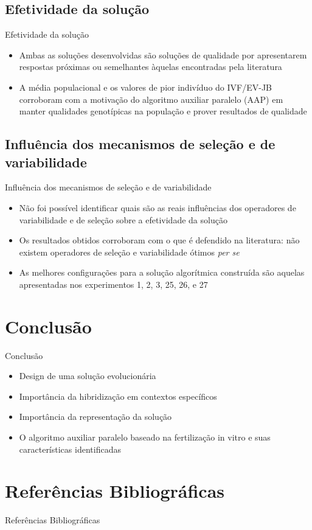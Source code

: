 \documentclass{beamer}
\begin{document}
\subsection{Efetividade da solução}
\begin{frame}{Efetividade da solução}
\begin{itemize}
\item<1-> Ambas as solu\c{c}\~{o}es desenvolvidas s\~{a}o solu\c{c}\~{o}es de qualidade por apresentarem respostas
pr\'{o}ximas ou semelhantes \`{a}quelas encontradas pela literatura
\item<2-> A m\'{e}dia populacional e os valores de pior indiv\'{i}duo do IVF/EV-JB corroboram com a motiva\c{c}\~{a}o
do algoritmo auxiliar paralelo (AAP) em manter qualidades genot\'{i}picas na popula\c{c}\~{a}o e prover resultados de
qualidade
\end{itemize}
\end{frame}

\subsection{Influência dos mecanismos de seleção e de variabilidade}
\begin{frame}{Influência dos mecanismos de seleção e de variabilidade}
\begin{itemize}
\item<1-> N\~{a}o foi poss\'{i}vel identificar quais s\~{a}o as reais influ\^{e}ncias dos operadores de variabilidade e de
sele\c{c}\~{a}o sobre a efetividade da solu\c{c}\~{a}o
\item<2-> Os resultados obtidos corroboram com o que é defendido na literatura: não existem operadores de seleção e variabilidade
ótimos \textit{per se}
\item<3-> As melhores configurações para a solução algorítmica construída são aquelas apresentadas nos experimentos
1, 2, 3, 25, 26, e 27
\end{itemize}
\end{frame}

\section{Conclusão}
\begin{frame}{Conclusão}
\begin{itemize}
\item Design de uma solução evolucionária
\item Importância da hibridização em contextos específicos
\item Importância da representação da solução
\item O algoritmo auxiliar paralelo baseado na fertilização in vitro e suas características identificadas
\end{itemize}
\end{frame}

\section{Referências Bibliográficas}
\begin{frame}[allowframebreaks]{Referências Bibliográficas}
\arial


\end{frame}
\end{document}
